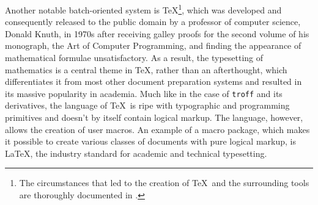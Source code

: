 \documentclass{book}
\begin{document}

        Another notable batch-oriented system is \TeX\footnote{
          The circumstances that led to the creation of \TeX\ and the
          surrounding tools are thoroughly documented in \cite{knuth98}.
        }, which was developed and consequently released to the public domain by
        a professor of computer science, Donald Knuth, in 1970s after receiving
        galley proofs for the second volume of his monograph, the Art of
        Computer Programming, and finding the appearance of mathematical
        formulae unsatisfactory. As a result, the typesetting of mathematics is
        a central theme in \TeX, rather than an afterthought, which
        differentiates it from most other document preparation systems and
        resulted in its massive popularity in academia. Much like in the case of
        \texttt{troff} and its derivatives, the language of \TeX\ is ripe with
        typographic and programming primitives and doesn't by itself contain
        logical markup. The language, however, allows the creation of user
        macros. An example of a macro package, which makes it possible to create
        various classes of documents with pure logical markup, is \LaTeX, the
        industry standard for academic and technical typesetting.
        

\end{document}
